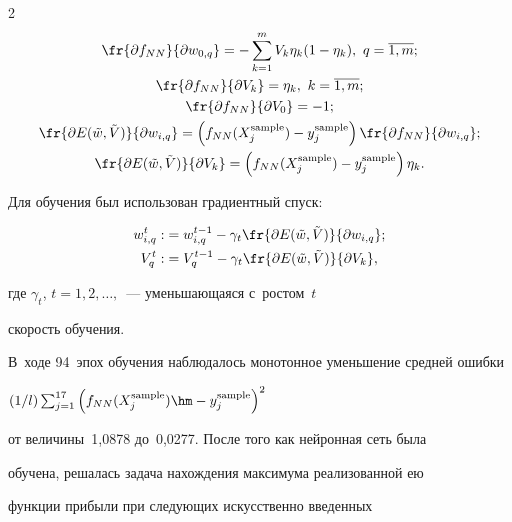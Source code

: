 \begin{multicols}{2}
\begin{gather*}
\fr{\partial f_{NN}} {\partial w_{0,q}}=


-\sum\limits_{k=1}^m V_k \eta_k (1 - \eta_k), \ q=\overline{1,m}; \\


\fr{\partial f_{NN}} {\partial V_k}=\eta_k, \ k=\overline{1,m}; \\


\fr{\partial f_{NN}} {\partial V_0}=-1;\\


\fr{\partial E(\tilde{w},\tilde{V})} {\partial w_{i,q}}= 


\left( f_{NN}(X_j^{\mathrm{sample}})-y_j^{\mathrm{sample}} \right) 


\fr{\partial f_{NN}} {\partial w_{i,q}}; \\


\fr{\partial E(\tilde{w},\tilde{V})} {\partial V_{k}}=\left( 


f_{NN}(X_j^{\mathrm{sample}})-y_j^{\mathrm{sample}} \right)\eta_k. 


\end{gather*}


Для обучения был использован градиентный спуск:


\begin{align*}


w_{i,q}^t:&=w_{i,q}^{t-1}-\gamma_t \fr{\partial E(\tilde{w},\tilde{V})}


{\partial w_{i,q}}; \\


 V_q^t:&=V_q^{t-1}-\gamma_t \fr{\partial E(\tilde{w},\tilde{V})} 


 {\partial V_{k}},


 \end{align*}


 где $\gamma_t$, $t=1,2,\ldots ,$~---  уменьшающаяся с~ростом~$t$ 


 скорость обучения.


В~ходе 94~эпох обучения наблюдалось монотонное уменьшение средней ошибки


 $({1}/{l})\sum\nolimits_{j=1}^{17}\left(f_{NN}(X_j^{\mathrm{sample}})\hm-


 y_j^{\mathrm{sample}}\right)^2$   


 от величины~1,0878   до~0,0277. После того как нейронная сеть была 


 обучена, решалась задача нахождения максимума реализованной ею


  функции прибыли  при следующих искусственно введенных 



\end{multicols}
